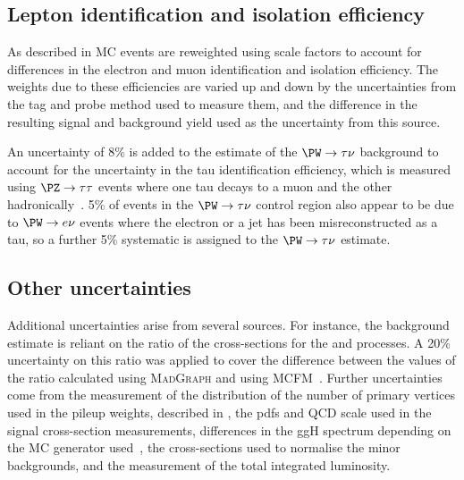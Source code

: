 \subsection{Lepton identification and isolation efficiency}
\label{sec:promptlepweights}
As described in  \ac{MC} events are reweighted using scale factors to account for differences in the electron and muon identification and isolation efficiency. The weights due to these efficiencies are varied up and down by the uncertainties from the tag and probe method used to measure them, and the difference in the resulting signal and background yield used as the uncertainty from this source.

An uncertainty of 8\% is added to the estimate of the $\PW\rightarrow\tau\nu$ background to account for the uncertainty in the tau identification efficiency, which is measured using $\PZ\rightarrow\tau\tau$ events where one tau decays to a muon and the other hadronically~\cite{Chatrchyan:1385560}. 5\% of events in the $\PW\rightarrow\tau\nu$ control region also appear to be due to $\PW\rightarrow e\nu$ events where the electron or a jet has been misreconstructed as a tau, so a further 5\% systematic is assigned to the $\PW\rightarrow\tau\nu$ estimate.


\subsection{Other uncertainties}
\label{sec:promptzextrap}
Additional uncertainties arise from several sources. For instance, the \Znunu background estimate is reliant on the ratio of the cross-sections for the \Znunu and \Zmumu processes. A 20\% uncertainty on this ratio was applied to cover the difference between the values of the ratio calculated using \textsc{MadGraph} and using \textsc{MCFM}~\cite{ARTICLE:CMSAN-12-403}. Further uncertainties come from the measurement of the distribution of the number of primary vertices used in the pileup weights, described in , the \ac{pdf}s and \ac{QCD} scale used in the signal cross-section measurements, differences in the \ac{ggH} \dphijj spectrum depending on the \ac{MC} generator used~\cite{ARTICLE:CMSAN-12-403}, the cross-sections used to normalise the minor backgrounds, and the measurement of the total integrated luminosity.


